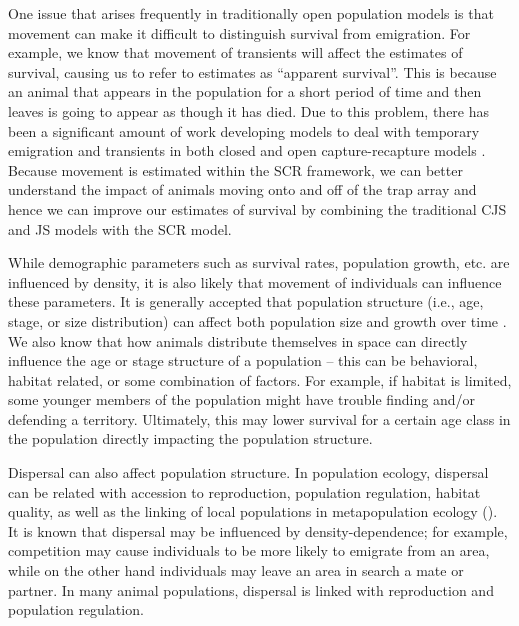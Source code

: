 One issue that arises frequently in traditionally open population models is that movement can
make it difficult to distinguish survival from emigration.
For example, we know that movement of transients will affect
the estimates of survival, causing us to refer to estimates as ``apparent survival''.
This is because an animal that appears in the population for a short period of time and then leaves
is going to appear as though it has died.  Due to this problem, there has been a significant amount
of work developing models to deal with temporary emigration and transients in both closed and open capture-recapture models 
\citep{kendall_etal:1997, pradel_hines:1997, hines_etal:2003, clavel_etal:2008}.  Because movement is estimated
within the SCR framework, we can better understand the impact of animals moving onto and off of the trap
array and hence we can improve our estimates of survival by combining the traditional CJS and JS models with
the SCR model. 

While demographic parameters such as 
survival rates, population growth, etc. are influenced by density, it is also likely that movement of individuals
can influence these parameters.  
It is generally accepted that population structure (i.e., age, stage, or size distribution) can affect
 both population size and growth over time \cite{caswell_werner:1978}.
We also know that how animals distribute themselves in space
can directly influence the age or stage structure of a population -- this can be behavioral, habitat
related, or some combination of factors.
For example, if habitat is limited, 
some younger members of the population might have trouble finding
and/or defending a territory.  Ultimately, this may lower survival for a certain age class in the population directly
impacting the population structure.

Dispersal can also affect population structure.  In population ecology, dispersal can be related with accession to reproduction, 
population regulation, habitat quality, as well as the linking of local populations in metapopulation 
ecology (\cite{clobert_etal:2001, ovaskainen:2004, ovaskainen_etal:2008}).   It is known
that dispersal may be influenced by density-dependence; for example, competition may cause individuals
to be more likely to emigrate from an area, while on the other hand individuals may leave an area in search 
a mate or partner.  
In many
animal populations, dispersal is linked with reproduction and
population regulation.


 




